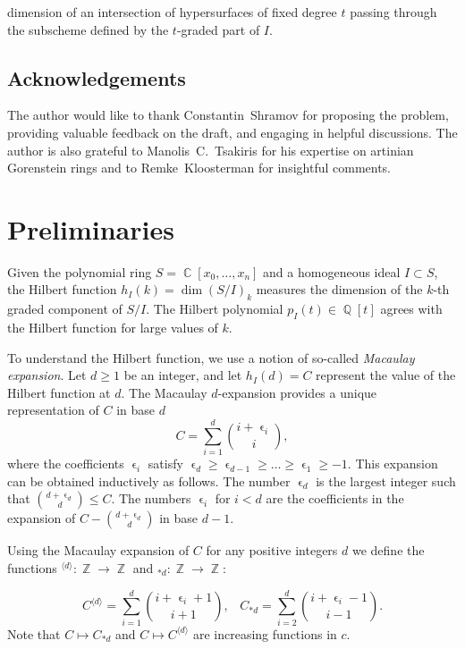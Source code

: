 \documentclass[a4paper,11pt,english,german]{amsart}
\makeatletter
\newcommand*{\qrr@gobblenexttocentry}[5]{}
\newcommand*{\qrr@gobblenexttocentry}[4]{}
\newcommand*{\addsubsection}{%
    \addtocontents{toc}{\protect\qrr@gobblenexttocentry}%
    \subsection}
\DeclareMathOperator{\Q}{\mathbb{Q}}
\DeclareMathOperator{\C}{\mathbb{C}}
\DeclareMathOperator{\Z}{\mathbb{Z}}
\DeclareMathOperator{\eps}{\epsilon}
\theoremstyle{definition}
\makeatother
\begin{document}
dimension of an intersection of hypersurfaces of fixed degree $t$ passing through the subscheme defined by the $t$-graded part of $I$.

\addsubsection*{Acknowledgements}

	The author would like to thank Constantin~Shramov for proposing the problem, providing valuable feedback on the draft, and engaging in helpful discussions. The author is also grateful to Manolis~C.~Tsakiris for his expertise on artinian Gorenstein rings and to Remke~Kloosterman for insightful comments.


\section{Preliminaries}\label{2}

Given the polynomial ring $S = \C[x_0,\dots,x_n]$ and a homogeneous ideal $I \subset S$, the Hilbert function $h_I(k) = \dim (S/I)_k$ measures the dimension of the $k$-th graded component of $S/I$. The Hilbert polynomial $p_I(t) \in \Q[t]$ agrees with the Hilbert function for large values of $k$.

To understand the Hilbert function, we use a notion of so-called \emph{Macaulay expansion}. Let $d \geqslant 1$ be an integer, and let $h_I(d)=C$ represent the value of the Hilbert function at $d$. The Macaulay $d$-expansion provides a unique representation of $C$ in base $d$
\begin{equation*}
	C=\sum\limits_{i=1}^{d}\binom{i+\eps_i}{i},
\end{equation*}
where the coefficients $\eps_i$ satisfy $\eps_d \geqslant \eps_{d-1} \geqslant \dots \geqslant \eps_{1} \geqslant -1$. This expansion can be obtained inductively as follows. The number $\eps_d$ is the largest integer such that $\binom{d+\eps_d}{d} \leqslant C$. The numbers $\eps_i$ for $i<d$ are the coefficients in the expansion of $C-\binom{d+\eps_d}{d}$ in base $d-1$.

Using the Macaulay expansion of $C$ for any positive integers $d$ we define the  functions $^{\langle d \rangle}:\Z\to \Z$ and $_{\ast d}:\Z\to \Z$:

\begin{equation*}
	C^{\langle d \rangle}=\sum\limits_{i=1}^{d}\binom{i+\eps_i+1}{i+1}, \hspace{10pt} C_{\ast d}=\sum\limits_{i=2}^d \binom{i+\eps_i -1}{i-1}.
\end{equation*}
Note that $C \mapsto C_{\ast d}$ and $C\mapsto C^{\langle d\rangle}$ are increasing functions in $c$.
\end{document}
